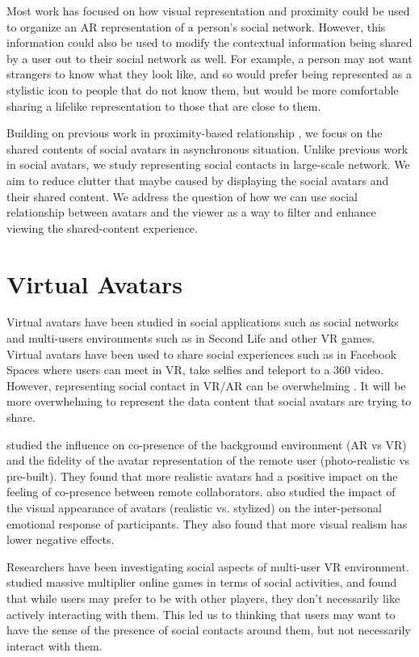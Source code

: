 Most work has focused on how visual representation and proximity could be used to organize an AR representation of a person's social network. However, this information could also be used to modify the contextual information being shared by a user out to their social network as well. For example, a person may not want strangers to know what they look like, and so would prefer being represented as a stylistic icon to people that do not know them, but would be more comfortable sharing a lifelike representation to those that are close to them. 

Building on previous work in proximity-based relationship \cite{Sousa2016}, we focus on the shared contents of social avatars in asynchronous situation. Unlike previous work in social avatars, we study representing social contacts in large-scale network. We aim to reduce clutter that maybe caused by displaying the social avatars and their shared content. We address the question of how we can use social relationship between avatars and the viewer as a way to filter and enhance viewing the shared-content experience. 


\section{Virtual Avatars}

Virtual avatars have been studied in social applications such as social networks and multi-users environments such as in Second Life \cite{Kaplan2009} and other VR games. Virtual avatars have been used to share social experiences such as in Facebook Spaces\cite{Facebook} where users can meet in VR, take selfies and teleport to a 360 video. However, representing social contact in VR/AR can be overwhelming \cite{Nassani2017b}. It will be more overwhelming to represent the data content that social avatars are trying to share. 

\cite{Jo2016} studied the influence on co-presence of the background environment (AR vs VR) and the fidelity of the avatar representation of the remote user (photo-realistic vs pre-built). They found that more realistic avatars had a positive impact on the feeling of co-presence between remote collaborators. \cite{Volante2016} also studied the impact of the visual appearance of avatars (realistic vs. stylized) on the inter-personal emotional response of participants. They also found that more visual realism has lower negative effects.

Researchers  have been investigating social aspects of multi-user VR environment. \cite{Ducheneaut2006} studied massive multiplier online games in terms of social activities, and  found that while users may prefer to be with other players, they don't necessarily like actively interacting with them. This led us to thinking that users may want to have the sense of the presence of social contacts around them, but not necessarily interact with them.

